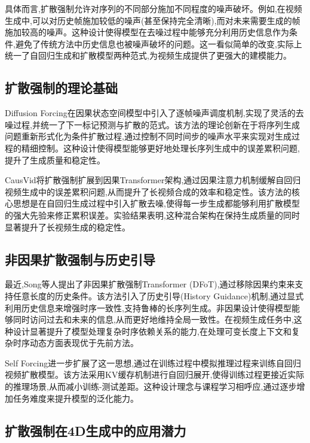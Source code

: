 具体而言,扩散强制允许对序列的不同部分施加不同程度的噪声破坏。例如,在视频生成中,可以对历史帧施加较低的噪声(甚至保持完全清晰),而对未来需要生成的帧施加较高的噪声。这种设计使得模型在去噪过程中能够充分利用历史信息作为条件,避免了传统方法中历史信息也被噪声破坏的问题。这一看似简单的改变,实际上统一了自回归生成和扩散模型两种范式,为视频生成提供了更强大的建模能力。

\subsection{扩散强制的理论基础}

Diffusion Forcing\cite{chen2024diffusion}在因果状态空间模型中引入了逐帧噪声调度机制,实现了灵活的去噪过程,并统一了下一标记预测与扩散的范式。该方法的理论创新在于将序列生成问题重新形式化为条件扩散过程,通过控制不同时间步的噪声水平来实现对生成过程的精细控制。这种设计使得模型能够更好地处理长序列生成中的误差累积问题,提升了生成质量和稳定性。

CausVid\cite{yin2024causvid}将扩散强制扩展到因果Transformer架构,通过因果注意力机制缓解自回归视频生成中的误差累积问题,从而提升了长视频合成的效率和稳定性。该方法的核心思想是在自回归生成过程中引入扩散去噪,使得每一步生成都能够利用扩散模型的强大先验来修正累积误差。实验结果表明,这种混合架构在保持生成质量的同时显著提升了长视频生成的稳定性。

\subsection{非因果扩散强制与历史引导}

最近,Song等人\cite{song2025history}提出了非因果扩散强制Transformer (DFoT),通过移除因果约束来支持任意长度的历史条件。该方法引入了历史引导(History Guidance)机制,通过显式利用历史信息来增强时序一致性,支持鲁棒的长序列生成。非因果设计使得模型能够同时访问过去和未来的信息,从而更好地维持全局一致性。在视频生成任务中,这种设计显著提升了模型处理复杂时序依赖关系的能力,在处理可变长度上下文和复杂时序动态方面表现优于先前方法。

Self Forcing\cite{huang2025self}进一步扩展了这一思想,通过在训练过程中模拟推理过程来训练自回归视频扩散模型。该方法采用KV缓存机制进行自回归展开,使得训练过程更接近实际的推理场景,从而减小训练-测试差距。这种设计理念与课程学习相呼应,通过逐步增加任务难度来提升模型的泛化能力。

\subsection{扩散强制在4D生成中的应用潜力}

